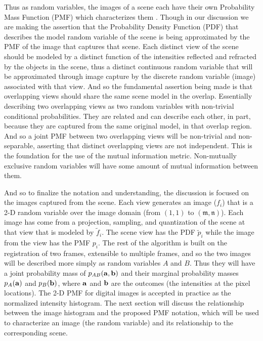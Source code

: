 Thus as random variables, the images of a scene each have their own Probability Mass Function (PMF) which characterizes them \cite{Papoulis2002}. Though in our discussion we are making the assertion that the Probability Density Function (PDF) that describes the model random variable of the scene is being approximated by the PMF of the image that captures that scene. Each distinct view of the scene should be modeled by a distinct function of the intensities reflected and refracted by the objects in the scene, thus a distinct continuous random variable that will be approximated through image capture by the discrete random variable (image) associated with that view. And so the fundamental assertion being made is that overlapping views should share the same scene model in the overlap. Essentially describing two overlapping views as two random variables with non-trivial conditional probabilities. They are related and can describe each other, in part, because they are captured from the same original model, in that overlap region. And so a joint PMF between two overlapping views will be non-trivial and non-separable, asserting that distinct overlapping views are not independent. This is the foundation for the use of the mutual information metric. Non-mutually exclusive random variables will have some amount of mutual information between them.

And so to finalize the notation and understanding, the discussion is focused on the images captured from the scene. Each view generates an image ($f_{i}$) that is a 2-D random variable over the image domain (from $(1,1)$ to $(\mathfrak{m},\mathfrak{n})$). Each image has come from a projection, sampling, and quantization of the scene at that view that is modeled by $\tilde{f}_{i}$. The scene view has the PDF $\tilde{p}_{i}$ while the image from the view has the PMF $p_{i}$. The rest of the algorithm is built on the registration of two frames, extensible to multiple frames, and so the two images will be described more simply as random variables $A$ and $B$. Thus they will have a joint probability mass of $p_{AB}(\bf{a},\bf{b})$ and their marginal probability masses $p_{A}(\bf{a})$ and $p_{B}(\bf{b})$, where $\bf{a}$ and $\bf{b}$ are the outcomes (the intensities at the pixel locations). The 2-D PMF for digital images is accepted in practice as the normalized intensity histogram. The next section will discuss the relationship between the image histogram and the proposed PMF notation, which will be used to characterize an image (the random variable) and its relationship to the corresponding scene.




